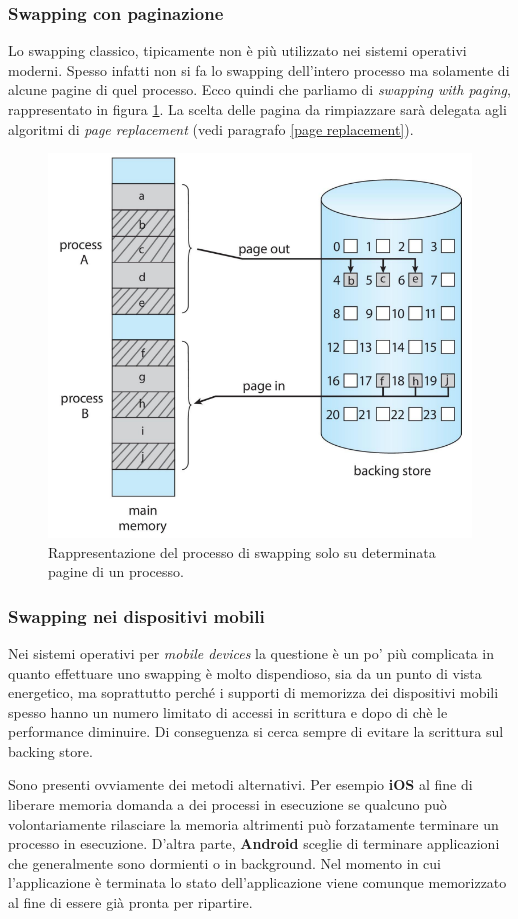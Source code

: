 % 
\subsubsection{Swapping con paginazione}
Lo swapping classico, tipicamente non è più utilizzato nei sistemi operativi moderni. Spesso infatti non si fa lo swapping dell'intero processo ma solamente di alcune pagine di quel processo. Ecco quindi che parliamo di \textit{swapping with paging}, rappresentato in figura \ref{fig:swapping_with_paging}. La scelta delle pagina da rimpiazzare sarà delegata agli algoritmi di \textit{page replacement} (vedi paragrafo \ref{page replacement}).
\begin{figure}[h]
    \centering
    \includegraphics[width = .5\textwidth]{../res/imgs/main memory/swapping_with_paging.png}
    \caption{Rappresentazione del processo di swapping solo su determinata pagine di un processo.}
    \label{fig:swapping_with_paging}
\end{figure}

% 
\subsubsection{Swapping nei dispositivi mobili}
Nei sistemi operativi per \textit{mobile devices} la questione è un po' più complicata in quanto effettuare uno swapping è molto dispendioso, sia da un punto di vista energetico, ma soprattutto perché i supporti di memorizza dei dispositivi mobili spesso hanno un numero limitato di accessi in scrittura e dopo di chè le performance diminuire. Di conseguenza si cerca sempre di evitare la scrittura sul backing store.

Sono presenti ovviamente dei metodi alternativi. Per esempio \textbf{iOS} al fine di liberare memoria domanda a dei processi in esecuzione se qualcuno può volontariamente rilasciare la memoria altrimenti può forzatamente terminare un processo in esecuzione. D'altra parte, \textbf{Android} sceglie di terminare applicazioni che generalmente sono dormienti o in background. Nel momento in cui l'applicazione è terminata lo stato dell'applicazione viene comunque memorizzato al fine di essere già pronta per ripartire.  

